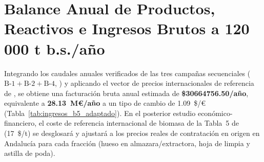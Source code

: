 \documentclass{report}
\begin{document}
\section{Balance Anual de Productos, Reactivos e Ingresos Brutos a 120\,000 t b.s./año}
Integrando los caudales anuales verificados de las tres campañas secuenciales ($\text{B-1} + \text{B-2} + \text{B-4}$, \textcite[Tabla~8]{Jafari-Gohargan2026}) y aplicando el vector de precios internacionales de referencia de \textcite[Tabla~5]{Jafari-Gohargan2026}, se obtiene una facturación bruta anual estimada de \textbf{\$\num{30664756.50}/año}, equivalente a \textbf{\num{28.13}~M€/año} a un tipo de cambio de \num{1.09}~\$/€ (Tabla~\ref{tab:ingresos_b5_adaptado}). En el posterior estudio económico-financiero, el coste de referencia internacional de biomasa de la Tabla~5 de \textcite{Jafari-Gohargan2026} (\num{17}~\$/t) se desglosará y ajustará a los precios reales de contratación en origen en Andalucía para cada fracción (hueso en almazara/extractora, hoja de limpia y astilla de poda).
\end{document}
